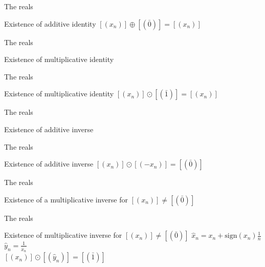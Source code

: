 \documentclass{beamer}
\begin{document}
\begin{frame}{The reals}
        \begin{block}{Existence of additive identity}
		$[(x_n)] \oplus [(\bar{0})] = [(x_n)]$
	\end{block}
\end{frame}

\begin{frame}{The reals}
        \begin{block}{Existence of multiplicative identity}
        \end{block}
\end{frame}

\begin{frame}{The reals}
        \begin{block}{Existence of multiplicative identity}
                $[(x_n)] \odot [(\bar{1})] = [(x_n)]$
        \end{block}
\end{frame}

\begin{frame}{The reals}
        \begin{block}{Existence of additive inverse}
        \end{block}
\end{frame}

\begin{frame}{The reals}
        \begin{block}{Existence of additive inverse}
        	$[(x_n)] \odot [(-x_n)] = [(\bar{0})]$
	\end{block}
\end{frame}

\begin{frame}{The reals}
        \begin{block}{Existence of a multiplicative inverse for $[(x_n)] \neq [(\bar{0})]$}
        \end{block}
\end{frame}

\begin{frame}{The reals}
	\begin{block}{Existence of multiplicative inverse for $[(x_n)] \neq [(\bar{0})]$}
		$\hat{x}_n = x_n + \text{sign}(x_n)\frac{1}{n}$\\
		$\hat{y}_n = \frac{1}{\hat{x}_n}$\\
		$[(x_n)] \odot [(\hat{y}_n)] = [(\bar{1})]$
        \end{block}
\end{frame}
\end{document}
